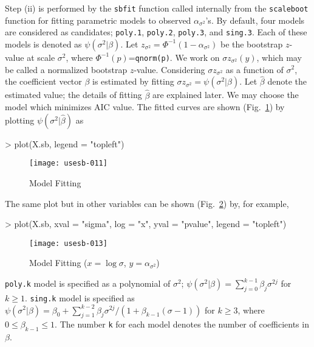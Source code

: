 \documentclass[a4paper]{amsart}
\begin{document}
Step (ii) is performed by the {\tt sbfit} function called internally
from the {\tt scaleboot} function for fitting parametric models to
observed $\alpha_{\sigma^2}$'s.  By default, four models are
considered as candidates; {\tt poly.1}, {\tt poly.2}, {\tt poly.3},
and {\tt sing.3}. Each of these models is denoted as
$\psi(\sigma^2|\beta)$. Let $z_{\sigma^2} = \Phi^{-1}( 1 -
\alpha_{\sigma^2})$ be the bootstrap $z$-value at scale $\sigma^2$,
where $\Phi^{-1}(p)$={\tt qnorm(p)}.  We work on $\sigma
z_{\sigma^2}(y)$, which may be called a normalized bootstrap
$z$-value.  Considering $\sigma z_{\sigma^2}$ as a function of
$\sigma^2$, the coefficient vector $\beta$ is estimated by fitting
$\sigma z_{\sigma^2} = \psi(\sigma^2 | \beta)$.  Let $\hat\beta$
denote the estimated value; the details of fitting $\hat\beta$ are
explained later.  We may choose the model which minimizes AIC
value. The fitted curves are shown (Fig.~\ref{fig:diag1f}) by plotting
$\psi(\sigma^2|\hat\beta)$ as
\begin{Schunk}
\begin{Sinput}
> plot(X.sb, legend = "topleft")
\end{Sinput}
\end{Schunk}
\begin{figure}
\begin{center}
\texttt{[image: usesb-011]}
\caption{Model Fitting}\label{fig:diag1f}
\end{center}
\end{figure}
The same plot but in other variables can be shown
(Fig.~\ref{fig:diag1f2}) by, for example,
\begin{Schunk}
\begin{Sinput}
> plot(X.sb, xval = "sigma", log = "x", yval = "pvalue", legend = "topleft")
\end{Sinput}
\end{Schunk}
\begin{figure}
\begin{center}
\texttt{[image: usesb-013]}
\caption{Model Fitting ($x=\log \sigma$, $y=\alpha_{\sigma^2}$)}
\label{fig:diag1f2}
\end{center}
\end{figure}



{\tt poly.k} model is specified as a polynomial of $\sigma^2$;
$\psi(\sigma^2|\beta) = \sum_{j=0}^{k-1} \beta_j \sigma^{2j}$ for
$k\ge1$.  {\tt sing.k} model is specified as $\psi(\sigma^2|\beta) =
\beta_0 + \sum_{j=1}^{k-2} \beta_j \sigma^{2j}/(1 +
\beta_{k-1}(\sigma-1))$ for $k\ge3$, where $0\le\beta_{k-1}\le1$. The
number {\tt k} for each model denotes the number of coefficients in
$\beta$.
\end{document}
